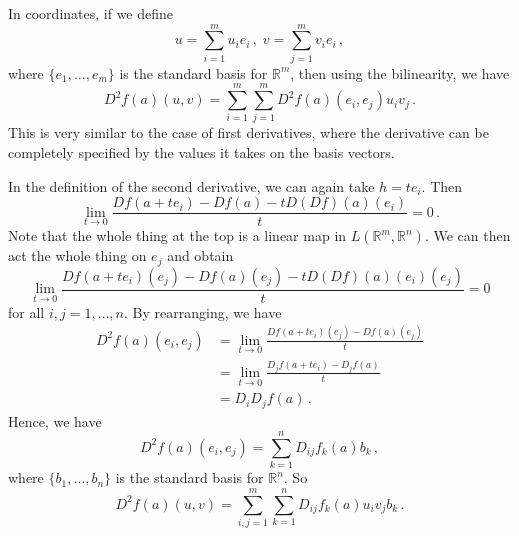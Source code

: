 \documentclass{article}
\theoremstyle{plain}\theoremheaderfont{\normalfont\itshape}\theorembodyfont{\rmfamily}\theoremseparator{.}\newtheorem*{rem}{Remark}\newtheorem*{ex}{Example}\newtheorem*{proof}{Proof}\newtheorem*{altp}{Alternative proof}
\theoremstyle{plain}\theoremheaderfont{\normalfont\bfseries}\theorembodyfont{\rmfamily}\theoremseparator{.}\newtheorem{thm}{Theorem}[section]\newtheorem{lem}[thm]{Lemma}\newtheorem{prop}[thm]{Proposition}\newtheorem*{cor}{Corollary}\newtheorem{defn}[thm]{Definition}\newtheorem{clm}[thm]{Claim}\newtheorem{clminproof}{Claim}
\theoremstyle{break}\theoremheaderfont{\normalfont\itshape}\theorembodyfont{\rmfamily}\theoremseparator{.\medskip}\newtheorem*{proofskip}{Proof}\newtheorem*{exs}{Examples}\newtheorem*{rems}{Remarks}
\theoremstyle{break}\theoremheaderfont{\normalfont\bfseries}\theorembodyfont{\rmfamily}\theoremseparator{.\medskip}\newtheorem{lemskip}[thm]{Lemma}\newtheorem{defnskip}[thm]{Definition}\newtheorem{propskip}[thm]{Proposition}\newtheorem{thmskip}[thm]{Theorem}
\begin{document}
    In coordinates, if we define
    \[u=\sum_{i=1}^{m}u_ie_i\,,\;v=\sum_{j=1}^{m}v_ie_i\,,\]
    where \(\{e_1,\dots,e_m\}\) is the standard basis for \(\mathbb{R}^m\), then using the bilinearity, we have
    \[D^2f(a)(u,v)=\sum_{i=1}^{m}\sum_{j=1}^{m}D^2f(a)(e_i,e_j)u_iv_j\,.\]
    This is very similar to the case of first derivatives, where the derivative can be completely specified by the values it takes on the basis vectors.

    In the definition of the second derivative, we can again take \(h=te_i\). Then
    \[\lim_{t\to 0}\frac{Df(a+te_i)-Df(a)-tD(Df)(a)(e_i)}{t}=0\,.\]
    Note that the whole thing at the top is a linear map in \(L(\mathbb{R}^m,\mathbb{R}^n)\). We can then act the whole thing on \(e_j\) and obtain
    \[\lim_{t\to 0}\frac{Df(a+te_i)(e_j)-Df(a)(e_j)-tD(Df)(a)(e_i)(e_j)}{t}=0\]
    for all \(i,j=1,\dots,n\). By rearranging, we have
    \begin{align*}
        D^2f(a)(e_i,e_j)&=\lim_{t\to 0}\frac{Df(a+te_i)(e_j)-Df(a)(e_j)}{t}\\
        &=\lim_{t\to 0}\frac{D_j f(a+te_i)-D_jf(a)}{t}\\
        &=D_iD_jf(a)\,.
    \end{align*}
    Hence, we have
    \[D^2f(a)(e_i,e_j)=\sum_{k=1}^{n}D_{ij}f_k(a)b_k\,,\]
    where \(\{b_1,\dots,b_n\}\) is the standard basis for \(\mathbb{R}^n\). So
    \[D^2f(a)(u,v)=\sum_{i,j=1}^{m}\sum_{k=1}^{n}D_{ij}f_k(a)u_iv_jb_k\,.\]
\end{document}

